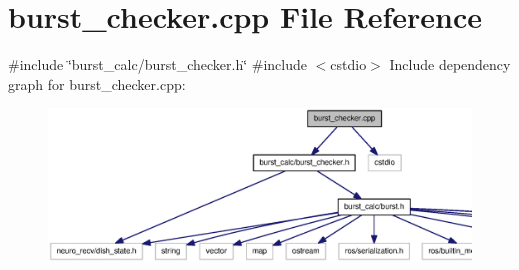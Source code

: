 \section{burst\-\_\-checker.\-cpp \-File \-Reference}
\label{burst__checker_8cpp}
{\ttfamily \#include \char`\"{}burst\-\_\-calc/burst\-\_\-checker.\-h\char`\"{}}\*
{\ttfamily \#include $<$cstdio$>$}\*
\-Include dependency graph for burst\-\_\-checker.\-cpp\-:\nopagebreak
\begin{figure}[H]
\begin{center}
\leavevmode
\includegraphics[width=350pt]{burst__checker_8cpp__incl}
\end{center}
\end{figure}
